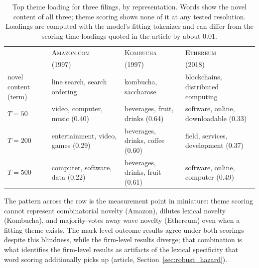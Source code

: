 \begin{table}[!htbp]\centering\small
\caption{Top theme loading for three filings, by representation. Words
show the novel content of all three; theme scoring shows none of it at
any tested resolution. Loadings are computed with the model's fitting
tokenizer and can differ from the scoring-time loadings quoted in the
article by about 0.01.}
\label{tab:exhibit}
\begin{tabular}{lp{3.1cm}p{3.1cm}p{3.1cm}}
\toprule
& \textsc{Amazon.com} & \textsc{Kombucha} & \textsc{Ethereum} \\
& (1997) & (1997) & (2018) \\
\midrule
novel content (term) & line search, search ordering & kombucha, saccharose & blockchains, distributed computing \\
$T=50$ & video, computer, music (0.40) & beverages, fruit, drinks (0.64) & software, online, downloadable (0.33) \\
$T=200$ & entertainment, video, games (0.29) & beverages, drinks, coffee (0.60) & field, services, development (0.37) \\
$T=500$ & computer, software, data (0.22) & beverages, drinks, fruit (0.61) & software, online, computer (0.49) \\
\bottomrule
\end{tabular}
\end{table}

The pattern across the row is the measurement point in miniature: theme
scoring cannot represent combinatorial novelty (Amazon), dilutes lexical
novelty (Kombucha), and majority-votes away wave novelty (Ethereum) even
when a fitting theme exists. The mark-level outcome results agree under
both scorings despite this blindness, while the firm-level results
diverge; that combination is what identifies the firm-level results as
artifacts of the lexical specificity that word scoring additionally
picks up (article, Section~\ref{sec:robust_hazard}).

